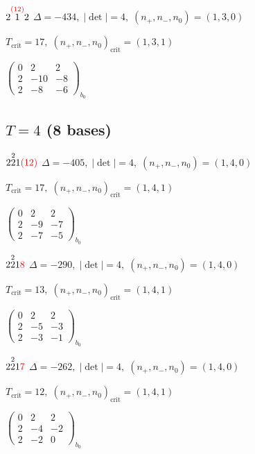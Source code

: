 \documentclass[10pt]{article}
\begin{document}
$2\overset{\textcolor{red}{(12)}}{1}2$ \quad $\Delta=-434,\; |\det|=4,\; (n_+,n_-,n_0)=(1,3,0)$

\hspace{1em}$T_{\text{crit}}=17,\; (n_+,n_-,n_0)_{\text{crit}}=(1,3,1)$

\hspace{2em}$\left(\begin{smallmatrix}0 & 2 & 2 \\ 2 & -10 & -8 \\ 2 & -8 & -6\end{smallmatrix}\right)_{\!b_0}$


\subsection*{$T = 4$ \quad (8 bases)}
\smallskip

$2\overset{2}{2}1\textcolor{red}{(12)}$ \quad $\Delta=-405,\; |\det|=4,\; (n_+,n_-,n_0)=(1,4,0)$

\hspace{1em}$T_{\text{crit}}=17,\; (n_+,n_-,n_0)_{\text{crit}}=(1,4,1)$

\hspace{2em}$\left(\begin{smallmatrix}0 & 2 & 2 \\ 2 & -9 & -7 \\ 2 & -7 & -5\end{smallmatrix}\right)_{\!b_0}$

$2\overset{2}{2}1\textcolor{red}{8}$ \quad $\Delta=-290,\; |\det|=4,\; (n_+,n_-,n_0)=(1,4,0)$

\hspace{1em}$T_{\text{crit}}=13,\; (n_+,n_-,n_0)_{\text{crit}}=(1,4,1)$

\hspace{2em}$\left(\begin{smallmatrix}0 & 2 & 2 \\ 2 & -5 & -3 \\ 2 & -3 & -1\end{smallmatrix}\right)_{\!b_0}$

$2\overset{2}{2}1\textcolor{red}{7}$ \quad $\Delta=-262,\; |\det|=4,\; (n_+,n_-,n_0)=(1,4,0)$

\hspace{1em}$T_{\text{crit}}=12,\; (n_+,n_-,n_0)_{\text{crit}}=(1,4,1)$

\hspace{2em}$\left(\begin{smallmatrix}0 & 2 & 2 \\ 2 & -4 & -2 \\ 2 & -2 & 0\end{smallmatrix}\right)_{\!b_0}$
\end{document}
